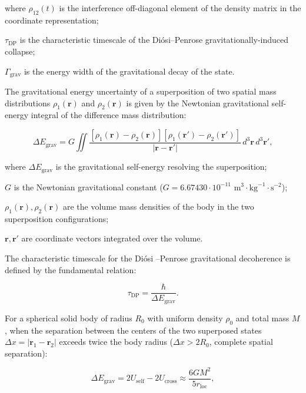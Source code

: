 \documentclass[11pt,a4paper]{article}
\theoremstyle{definition}
\begin{document}
where $\rho_{12}(t)$ is the interference off-diagonal element of the density matrix in the coordinate representation;  

$\tau_{\text{DP}}$ is the characteristic timescale of the Diósi--Penrose gravitationally-induced collapse;  

$\Gamma_{\text{grav}}$ is the energy width of the gravitational decay of the state.

The gravitational energy uncertainty of a superposition of two spatial mass distributions $\rho_1(\mathbf{r})$ and $\rho_2(\mathbf{r})$ is given by the Newtonian gravitational self-energy integral of the difference mass distribution:

\begin{equation}\label{eq:5.34}\tag{5.34}
\Delta E_{\text{grav}} = G \iint \frac{[\rho_1(\mathbf{r}) - \rho_2(\mathbf{r})][\rho_1(\mathbf{r}') - \rho_2(\mathbf{r}')]}{|\mathbf{r} - \mathbf{r}'|} \, d^3\mathbf{r} \, d^3\mathbf{r}',
\end{equation}

where $\Delta E_{\text{grav}}$ is the gravitational self-energy resolving the superposition;  

$G$ is the Newtonian gravitational constant ($G = 6.67430 \cdot 10^{-11}\text{ m}^3\cdot\text{kg}^{-1}\cdot\text{s}^{-2}$);  

$\rho_1(\mathbf{r}), \rho_2(\mathbf{r})$ are the volume mass densities of the body in the two superposition configurations;  

$\mathbf{r}, \mathbf{r}'$ are coordinate vectors integrated over the volume.

The characteristic timescale for the Diósi \cite{ref40}--Penrose \cite{ref41} gravitational decoherence is defined by the fundamental relation:

\begin{equation}\label{eq:5.35}\tag{5.35}
\tau_{\text{DP}} = \frac{\hbar}{\Delta E_{\text{grav}}}.
\end{equation}

For a spherical solid body of radius $R_0$ with uniform density $\rho_0$ and total mass $M$, when the separation between the centers of the two superposed states $\Delta x = |\mathbf{r}_1 - \mathbf{r}_2|$ exceeds twice the body radius ($\Delta x > 2 R_0$, complete spatial separation):

\begin{equation}\label{eq:5.36}\tag{5.36}
\Delta E_{\text{grav}} = 2 U_{\text{self}} - 2 U_{\text{cross}} \approx \frac{6 G M^2}{5 r_{\text{loc}}},
\end{equation}
\end{document}
